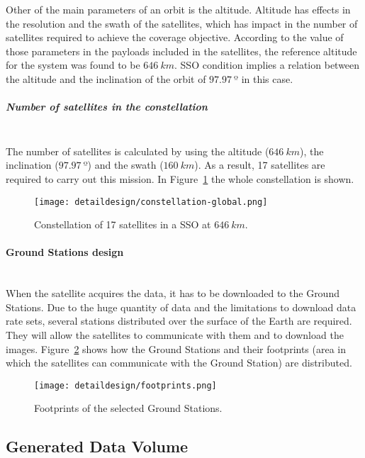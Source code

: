 Other of the main parameters of an orbit is the altitude. Altitude has effects
in the resolution and the swath of the satellites, which has impact in the
number of satellites required to achieve the coverage objective. According to
the value of those parameters in the payloads included in the satellites, the
reference altitude for the system was found to be $646~km$. \ac{SSO}
condition implies a relation between the altitude and the inclination of the
orbit of $97.97~º$ in this case.

\subparagraph{Number of satellites in the constellation}~\\
The number of satellites is calculated by using the altitude ($646~km$), the
inclination ($97.97~º$) and the swath ($160~km$). As a result, 17 satellites are
required to carry out this mission. In Figure~\ref{fig:intr-constellation-global} the whole constellation is
shown.

\begin{figure}[!h]
\begin{center}
\texttt{[image: detaildesign/constellation-global.png]}
\caption{Constellation of 17 satellites in a SSO at $646~km$.}
\label{fig:intr-constellation-global}
\end{center}
\end{figure}

\paragraph{Ground Stations design}~\\
When the satellite acquires the data, it has to be downloaded to the Ground
Stations. Due to the huge
quantity of data and the limitations to download data rate sets, several
stations distributed over the surface of the Earth are required. They will allow
the satellites to communicate with them and to download the
images. Figure~\ref{fig:intr-footprints} shows how the Ground Stations and their
footprints (area in which the satellites can communicate with the Ground
Station) are distributed.


\begin{figure}[!h]
\begin{center}
\texttt{[image: detaildesign/footprints.png]}
\caption{Footprints of the selected Ground Stations.}
\label{fig:intr-footprints}
\end{center}
\end{figure}

\subsection{Generated Data Volume}

